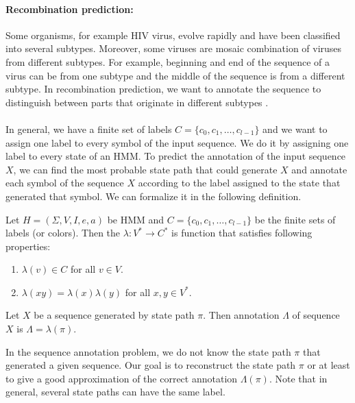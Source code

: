 \paragraph{Recombination prediction:} Some organisms, for example HIV virus,
evolve rapidly and have been classified into several subtypes.  Moreover,
some viruses are mosaic combination of viruses from different subtypes. For
example, beginning and end of the sequence of a virus can be from one subtype and
the middle of the sequence is from a different subtype. In recombination prediction,
we want to annotate the sequence to distinguish between parts that originate in
different subtypes \cite{Nanasi2010,Truszkowski2011}.  

\paragraph{} In general,
we have a finite set of labels $C=\{c_0,c_1,\dots,c_{l-1}\}$ and we want to
assign one label to every symbol of the input sequence. We do it by assigning
one label to every state of an HMM.
To predict the annotation of the input sequence $X$, we can  find the
most probable state path that could generate $X$ and  annotate each symbol of
the sequence $X$ according to the label assigned to the state that generated that
symbol. We can formalize it in the following definition.

\begin{definition}\label{DEFINITION:ANNOTATION}
Let $H=(\Sigma,V,I,e,a)$ be HMM and $C=\{c_0,c_1,\dots,c_{l-1}\}$ be the finite
sets of labels (or colors). Then the  
$\lambda: V^*\to C^*$ is function that satisfies following properties:
\begin{enumerate}
\item $\lambda(v)\in C$ for all $v\in V$.
\item $\lambda(xy) = \lambda(x)\lambda(y)$ for all $x,y\in V^*$.
\end{enumerate}

Let $X$ be a sequence generated by state path $\pi$. Then annotation
$\Lambda$ of sequence $X$ is $\Lambda = \lambda(\pi)$.
\end{definition}

In the sequence annotation problem, we do not know the state path $\pi$ that
generated a given sequence. Our goal is to reconstruct the state path $\pi$ or
at least to give a good approximation of the correct annotation $\Lambda(\pi)$.
Note that in general, several state paths can have the same label.

